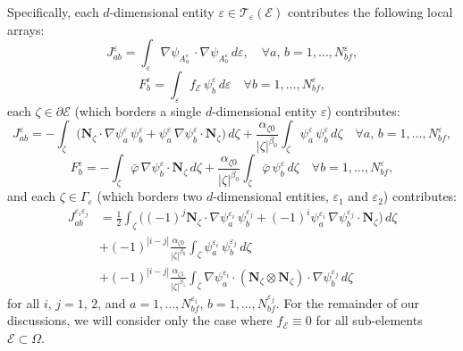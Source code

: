 	Specifically, each $d$-dimensional entity $\varepsilon \in \mathcal{T}_\varepsilon (\mathcal{E})$ contributes the following local arrays:
	\begin{equation}
			J^{\varepsilon}_{ab} = \int_{\varepsilon} \nabla \psi_{A^{\varepsilon}_a} \, \cdot \nabla \psi_{A^{\varepsilon}_b} \, d \varepsilon, \quad \forall a, \, b = 1, \ldots, N^{\varepsilon}_{bf},
	\end{equation}
	\begin{equation}
			F^{\varepsilon}_b = \int_{\varepsilon} f_{\mathcal{E}} \, \psi_b^{\varepsilon} \, d \varepsilon \quad \forall b = 1, \ldots, N^{\varepsilon}_{bf},
	\end{equation}
	each $\zeta \in \partial \mathcal{E}$ (which borders a single $d$-dimensional entity $\varepsilon$) contributes:
	\begin{equation}
			J^{\varepsilon}_{ab} = - \int_{\zeta} \bigg( \mathbf{N}_{\zeta} \cdot \nabla \psi^{\varepsilon}_a \, \psi^{\varepsilon}_b + \psi^{\varepsilon}_a \, \nabla \psi^{\varepsilon}_b \cdot \mathbf{N}_{\zeta} \bigg) \, d \zeta + \frac{\alpha_{\zeta0}}{|\zeta|^{\beta_0}} \int_{\zeta} \psi_a^{\varepsilon} \, \psi_b^{\varepsilon} \, d \zeta \quad \forall a, \, b = 1, \ldots, N^{\varepsilon}_{bf},
	\end{equation}
	\begin{equation}
		F^{\varepsilon}_b = - \int_{\zeta} \bar{\varphi} \, \nabla \psi_b^{\varepsilon} \cdot \mathbf{N}_{\zeta} \, d \zeta + \frac{\alpha_{\zeta0}}{|\zeta|^{\beta_0}} \int_{\zeta} \bar{\varphi} \, \psi_b^{\varepsilon} \, d \zeta \quad \forall b = 1, \ldots, N^{\varepsilon}_{bf},
		\label{eq:boundary_term}
	\end{equation}
	and each $\zeta \in \Gamma_\varepsilon$ (which borders two $d$-dimensional entities, $\varepsilon_1$ and $\varepsilon_2$) contributes:
	\begin{align}
			J^{\varepsilon_i \varepsilon_j}_{ab} & = \frac{1}{2} \int_{\zeta} \bigg( (-1)^{j} \mathbf{N}_{\zeta} \cdot \nabla \psi_a^{\varepsilon_i} \, \psi_b^{\varepsilon_j} + (-1)^{i} \psi_a^{\varepsilon_i} \, \nabla \psi_b^{\varepsilon_j} \cdot \mathbf{N}_{\zeta} \bigg) \, d \zeta \\
			& + (-1)^{|i-j|} \frac{\alpha_{\zeta0}}{|\zeta|^{\beta_0}} \int_{\zeta} \psi_a^{\varepsilon_i} \, \psi_b^{\varepsilon_j} \, d \zeta \\
			& + (-1)^{|i-j|} \frac{\alpha_{\zeta1}}{|\zeta|^{\beta_1}} \int_{\zeta} \nabla \psi_a^{\varepsilon_i} \cdot (\mathbf{N}_\zeta \otimes \mathbf{N}_\zeta) \cdot \nabla \psi_b^{\varepsilon_j} \, d \zeta
	\end{align}
	for all $i, \, j = 1, \, 2$, and $a = 1, \ldots, N^{\varepsilon_i}_{bf}$, $b = 1, \ldots, N^{\varepsilon_j}_{bf}$. For the remainder of our discussions, we will consider only the case where $f_\mathcal{E} \equiv 0$ for all sub-elements $\mathcal{E} \subset \Omega$.
	
